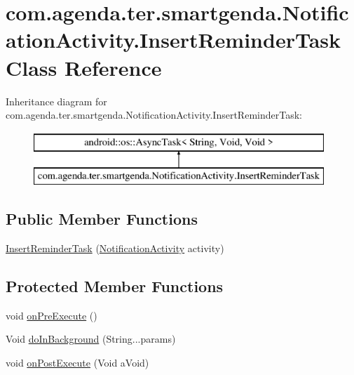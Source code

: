 \hypertarget{classcom_1_1agenda_1_1ter_1_1smartgenda_1_1_notification_activity_1_1_insert_reminder_task}{\section{com.\-agenda.\-ter.\-smartgenda.\-Notification\-Activity.\-Insert\-Reminder\-Task Class Reference}
\label{classcom_1_1agenda_1_1ter_1_1smartgenda_1_1_notification_activity_1_1_insert_reminder_task}
}
Inheritance diagram for com.\-agenda.\-ter.\-smartgenda.\-Notification\-Activity.\-Insert\-Reminder\-Task\-:\begin{figure}[H]
\begin{center}
\leavevmode
\includegraphics[height=2.000000cm]{classcom_1_1agenda_1_1ter_1_1smartgenda_1_1_notification_activity_1_1_insert_reminder_task}
\end{center}
\end{figure}
\subsection*{Public Member Functions}
\begin{DoxyCompactItemize}
\item 
\hyperlink{classcom_1_1agenda_1_1ter_1_1smartgenda_1_1_notification_activity_1_1_insert_reminder_task_ad45f979e81f8f64441758de06ad50624}{Insert\-Reminder\-Task} (\hyperlink{classcom_1_1agenda_1_1ter_1_1smartgenda_1_1_notification_activity}{Notification\-Activity} activity)
\end{DoxyCompactItemize}
\subsection*{Protected Member Functions}
\begin{DoxyCompactItemize}
\item 
void \hyperlink{classcom_1_1agenda_1_1ter_1_1smartgenda_1_1_notification_activity_1_1_insert_reminder_task_a7ae01541ada7187ab8384d2de87100d3}{on\-Pre\-Execute} ()
\item 
Void \hyperlink{classcom_1_1agenda_1_1ter_1_1smartgenda_1_1_notification_activity_1_1_insert_reminder_task_a4a647f5e839cc81a4589644bfd1a62b3}{do\-In\-Background} (String...\-params)
\item 
void \hyperlink{classcom_1_1agenda_1_1ter_1_1smartgenda_1_1_notification_activity_1_1_insert_reminder_task_a71011bfee380681b512924d6f06c9395}{on\-Post\-Execute} (Void a\-Void)
\end{DoxyCompactItemize}


